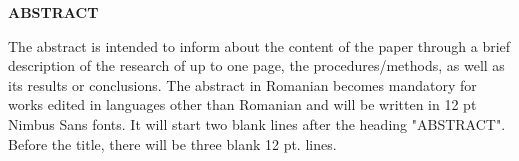 \thispagestyle{abstractpagestyle}

\vspace*{36pt}

\begin{center}
\textbf{\fontsize{20pt}{24pt} \selectfont ABSTRACT}
\end{center}

\vspace{24pt}

The abstract is intended to inform about the content of the paper 
through a brief description of the research of up to one page, the procedures/methods, as well as its results or conclusions. The abstract in Romanian becomes mandatory for works edited in languages other than Romanian and will be written in 12 pt Nimbus Sans fonts. It will start two blank lines after the heading "ABSTRACT". Before the title, there will be three blank 12 pt. lines.

\vfill